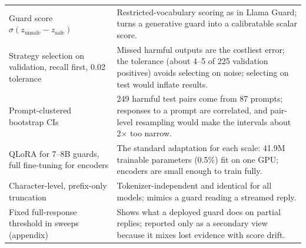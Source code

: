 \begin{table}[h]
\begin{tabular}{p{}p{}}
Guard score $\sigma(z_{\text{unsafe}}-z_{\text{safe}})$ & Restricted-vocabulary scoring as in Llama Guard; turns a generative guard into a calibratable scalar score. \\
Strategy selection on validation, recall first, 0.02 tolerance & Missed harmful outputs are the costliest error; the tolerance (about 4--5 of 225 validation positives) avoids selecting on noise; selecting on test would inflate results. \\
Prompt-clustered bootstrap CIs & 249 harmful test pairs come from 87 prompts; responses to a prompt are correlated, and pair-level resampling would make the intervals about 2$\times$ too narrow. \\
QLoRA for 7--8B guards, full fine-tuning for encoders & The standard adaptation for each scale: 41.9M trainable parameters (0.5\%) fit on one GPU; encoders are small enough to train fully. \\
Character-level, prefix-only truncation & Tokenizer-independent and identical for all models; mimics a guard reading a streamed reply. \\
Fixed full-response threshold in sweeps (appendix) & Shows what a deployed guard does on partial replies; reported only as a secondary view because it mixes lost evidence with score drift. \\
\bottomrule
\end{tabular}
\end{table}
